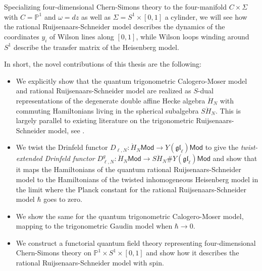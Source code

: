 \documentclass[11pt]{report}
\theoremstyle{definition}
\theoremstyle{remark}
\theoremstyle{remark}
\renewcommand{\P}{\mathbb{P}}
\begin{document}
Specializing four-dimensional Chern-Simons theory to the four-manifold $C \times \Sigma$ with $C = \P^1$ and $\omega = dz$ as well as $\Sigma = S^1 \times [0,1]$ a cylinder, we will see how the rational Ruijsenaars-Schneider model describes the dynamics of the coordinates $y_i$ of Wilson lines along $[0,1]$, while Wilson loops winding around $S^1$ describe the transfer matrix of the Heisenberg model.

In short, the novel contributions of this thesis are the following:
\begin{itemize}
\item We explicitly show that the quantum trigonometric Calogero-Moser model and rational Ruijsenaars-Schneider model are realized as $S$-dual representations of the degenerate double affine Hecke algebra $\ddot H_N$ with commuting Hamiltonians living in the spherical subalgebra $S\ddot H_N$. This is largely parallel to existing literature on the trigonometric Ruijsenaars-Schneider model, see \cite{article:lamers:2022}.
\item We twist the Drinfeld functor $D_{\ell,N}: \dot H_N \mathsf{Mod} \to Y(\mathfrak{gl}_\ell) \mathsf{Mod}$ to give the \emph{twist-extended Drinfeld functor} $D_{\ell,N}^g: \ddot H_N \mathsf{Mod} \to S\ddot H_N \# Y(\mathfrak{gl}_\ell) \mathsf{Mod}$ and show that it maps the Hamiltonians of the quantum rational Ruijsenaars-Schneider model to the Hamiltonians of the twisted inhomogeneous Heisenberg model in the limit where the Planck constant for the rational Ruijsenaars-Schneider model $\hbar$ goes to zero.
\item We show the same for the quantum trigonometric Calogero-Moser model, mapping to the trigonometric Gaudin model when $\hbar \to 0$.
\item We construct a functorial quantum field theory representing four-dimensional Chern-Simons theory on $\P^1 \times S^1 \times [0,1]$ and show how it describes the rational Ruijsenaars-Schneider model with spin.
\end{itemize}
\end{document}
